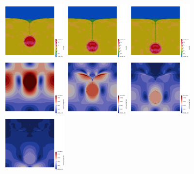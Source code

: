 \begin{center}
\includegraphics[width=3.3cm]{images/stokes_sphere_fs2D/harm_6_1/eta0100}
\includegraphics[width=3.3cm]{images/stokes_sphere_fs2D/harm_6_1/eta0150}
\includegraphics[width=3.3cm]{images/stokes_sphere_fs2D/harm_6_1/eta0200}\\
\includegraphics[width=3.3cm]{images/stokes_sphere_fs2D/harm_6_1/vel0000}
\includegraphics[width=3.3cm]{images/stokes_sphere_fs2D/harm_6_1/vel0050}
\includegraphics[width=3.3cm]{images/stokes_sphere_fs2D/harm_6_1/vel0100}
\includegraphics[width=3.3cm]{images/stokes_sphere_fs2D/harm_6_1/vel0150}

\end{center}
